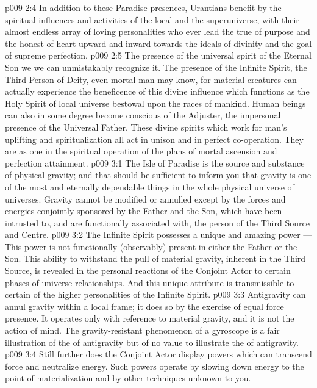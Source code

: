 \vs p009 2:4 In addition to these Paradise presences, Urantians benefit by the spiritual influences and activities of the local and the superuniverse, with their almost endless array of loving personalities who ever lead the true of purpose and the honest of heart upward and inward towards the ideals of divinity and the goal of supreme perfection.
\vs p009 2:5 The presence of the universal spirit of the Eternal Son we  we can unmistakably recognize it. The presence of the Infinite Spirit, the Third Person of Deity, even mortal man may know, for material creatures can actually experience the beneficence of this divine influence which functions as the Holy Spirit of local universe bestowal upon the races of mankind. Human beings can also in some degree become conscious of the Adjuster, the impersonal presence of the Universal Father. These divine spirits which work for man’s uplifting and spiritualization all act in unison and in perfect co\hyp{}operation. They are as one in the spiritual operation of the plans of mortal ascension and perfection attainment.
\vs p009 3:1 The Isle of Paradise is the source and substance of physical gravity; and that should be sufficient to inform you that gravity is one of the most  and eternally dependable things in the whole physical universe of universes. Gravity cannot be modified or annulled except by the forces and energies conjointly sponsored by the Father and the Son, which have been intrusted to, and are functionally associated with, the person of the Third Source and Centre.
\vs p009 3:2 \pc The Infinite Spirit possesses a unique and amazing power ---  This power is not functionally (observably) present in either the Father or the Son. This ability to withstand the pull of material gravity, inherent in the Third Source, is revealed in the personal reactions of the Conjoint Actor to certain phases of universe relationships. And this unique attribute is transmissible to certain of the higher personalities of the Infinite Spirit.
\vs p009 3:3 \pc Antigravity can annul gravity within a local frame; it does so by the exercise of equal force presence. It operates only with reference to material gravity, and it is not the action of mind. The gravity\hyp{}resistant phenomenon of a gyroscope is a fair illustration of the  of antigravity but of no value to illustrate the  of antigravity.
\vs p009 3:4 Still further does the Conjoint Actor display powers which can transcend force and neutralize energy. Such powers operate by slowing down energy to the point of materialization and by other techniques unknown to you.
